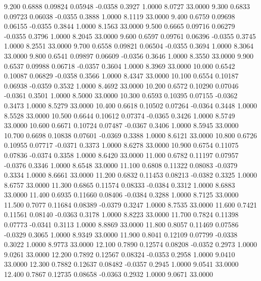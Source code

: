    9.200   0.6888   0.09824   0.05948  -0.0358   0.3927   1.0000   8.0727  33.0000
   9.300   0.6833   0.09723   0.06038  -0.0355   0.3888   1.0000   8.1119  33.0000
   9.400   0.6759   0.09698   0.06155  -0.0355   0.3844   1.0000   8.1563  33.0000
   9.500   0.6665   0.09716   0.06279  -0.0355   0.3796   1.0000   8.2045  33.0000
   9.600   0.6597   0.09761   0.06396  -0.0355   0.3745   1.0000   8.2551  33.0000
   9.700   0.6558   0.09821   0.06504  -0.0355   0.3694   1.0000   8.3064  33.0000
   9.800   0.6541   0.09897   0.06609  -0.0356   0.3646   1.0000   8.3550  33.0000
   9.900   0.6537   0.09988   0.06718  -0.0357   0.3604   1.0000   8.3969  33.0000
  10.000   0.6542   0.10087   0.06829  -0.0358   0.3566   1.0000   8.4347  33.0000
  10.100   0.6554   0.10187   0.06938  -0.0359   0.3532   1.0000   8.4692  33.0000
  10.200   0.6572   0.10290   0.07046  -0.0361   0.3501   1.0000   8.5000  33.0000
  10.300   0.6593   0.10395   0.07155  -0.0362   0.3473   1.0000   8.5279  33.0000
  10.400   0.6618   0.10502   0.07264  -0.0364   0.3448   1.0000   8.5528  33.0000
  10.500   0.6644   0.10612   0.07374  -0.0365   0.3426   1.0000   8.5749  33.0000
  10.600   0.6671   0.10724   0.07487  -0.0367   0.3406   1.0000   8.5945  33.0000
  10.700   0.6698   0.10838   0.07601  -0.0369   0.3388   1.0000   8.6121  33.0000
  10.800   0.6726   0.10955   0.07717  -0.0371   0.3373   1.0000   8.6278  33.0000
  10.900   0.6754   0.11075   0.07836  -0.0374   0.3358   1.0000   8.6420  33.0000
  11.000   0.6782   0.11197   0.07957  -0.0376   0.3346   1.0000   8.6548  33.0000
  11.100   0.6808   0.11322   0.08083  -0.0379   0.3334   1.0000   8.6661  33.0000
  11.200   0.6832   0.11453   0.08213  -0.0382   0.3325   1.0000   8.6757  33.0000
  11.300   0.6865   0.11574   0.08333  -0.0384   0.3312   1.0000   8.6883  33.0000
  11.400   0.6935   0.11660   0.08406  -0.0384   0.3288   1.0000   8.7125  33.0000
  11.500   0.7077   0.11684   0.08389  -0.0379   0.3247   1.0000   8.7535  33.0000
  11.600   0.7421   0.11561   0.08140  -0.0363   0.3178   1.0000   8.8223  33.0000
  11.700   0.7824   0.11398   0.07773  -0.0341   0.3113   1.0000   8.8869  33.0000
  11.800   0.8057   0.11469   0.07586  -0.0329   0.3065   1.0000   8.9349  33.0000
  11.900   0.8041   0.12109   0.07799  -0.0338   0.3022   1.0000   8.9773  33.0000
  12.100   0.7890   0.12574   0.08208  -0.0352   0.2973   1.0000   9.0261  33.0000
  12.200   0.7892   0.12567   0.08324  -0.0353   0.2958   1.0000   9.0410  33.0000
  12.300   0.7882   0.12637   0.08482  -0.0357   0.2945   1.0000   9.0541  33.0000
  12.400   0.7867   0.12735   0.08658  -0.0363   0.2932   1.0000   9.0671  33.0000

